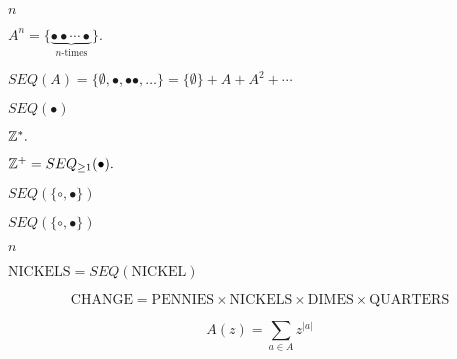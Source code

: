 \documentclass[10pt]{book}
\begin{document}
\begin{mdSnippets}
\begin{mdInlineSnippet}[7b8b965ad4bca0e41ab51de7b31363a1]
$n$\end{mdInlineSnippet}%
\begin{mdInlineSnippet}[2e07a12773ece05d1e72f5791c9df5fd]%
$A^n=\{\underbrace{\bullet\bullet\cdots\bullet}_{n\text{-times}}\}.$\end{mdInlineSnippet}%
\begin{mdInlineSnippet}[1482e22537fdc1c3ad506ab5a015b7d8]%
$SEQ(A)=\{\emptyset, \bullet, \bullet\bullet,\ldots\}=\{\emptyset\}+A+A^2+\cdots$\end{mdInlineSnippet}%
\begin{mdInlineSnippet}[5425a6c466d378d93f810a9b1169a8f2]%
$SEQ(\bullet)$\end{mdInlineSnippet}%
\begin{mdInlineSnippet}[8c6329bf24760e3874d8f5a743a02d89]%
$\mathbb{Z}^*.$\end{mdInlineSnippet}%
\begin{mdInlineSnippet}%
$\mathbb{Z}^+=SEQ_{\geq1}(\bullet).$\end{mdInlineSnippet}%
\begin{mdInlineSnippet}%
$SEQ(\{\circ,\bullet\})$\end{mdInlineSnippet}%
\begin{mdInlineSnippet}%
$SEQ(\{\circ,\bullet\})$\end{mdInlineSnippet}%
\begin{mdInlineSnippet}[7b8b965ad4bca0e41ab51de7b31363a1]%
$n$\end{mdInlineSnippet}%
\begin{mdInlineSnippet}[f3dd242e2fb7ae34fc44f4b9eed3ae67]%
$\text{NICKELS} = SEQ(\text{NICKEL})$\end{mdInlineSnippet}%
\begin{mdDisplaySnippet}[9d316fd89176a19114c12915c75a078f]%
\[%
\text{CHANGE} = \text{PENNIES}\times\text{NICKELS}\times\text{DIMES}\times\text{QUARTERS}
\]%
\end{mdDisplaySnippet}%
\begin{mdDisplaySnippet}[de189626c0f468f00af26235752660a7]%
\[%
A(z)=\sum_{a\in A}z^{|a|}
\]%
\end{mdDisplaySnippet}%

\end{mdSnippets}
\end{document}
